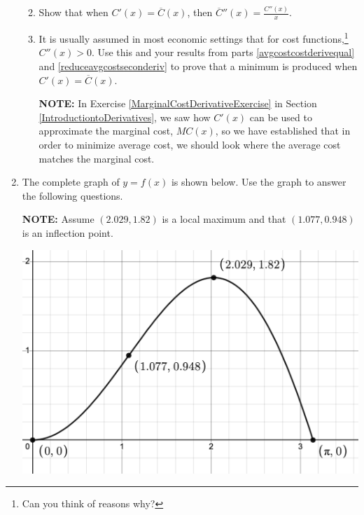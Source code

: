 \documentclass{ximera}
\begin{document}
\begin{enumerate}
\begin{enumerate}
\smallskip

\item\label{reduceavgcostseconderiv}  Show that when $C'(x) = \overline{C}(x)$, then $\overline{C}''(x)  = \frac{C''(x)}{x}$.

\smallskip

\item  It is usually assumed in most economic settings that for cost functions,\footnote{Can you think of reasons why?} $C''(x) > 0$.   Use this and your results from parts \ref{avgcostcostderivequal} and \ref{reduceavgcostseconderiv} to prove that a minimum is produced  when $C'(x) = \overline{C}(x)$.  

\smallskip

\textbf{NOTE:} In Exercise \ref{MarginalCostDerivativeExercise} in Section \ref{IntroductiontoDerivatives}, we saw how $C'(x)$ can be used to approximate the marginal cost, $MC(x)$, so we have established that in order to minimize average cost, we should look where the average cost matches the marginal cost.


\end{enumerate}

\item  The complete graph of $y = f(x)$ is shown below. Use the graph to answer the following questions.

\smallskip


\textbf{NOTE:} Assume $(2.029, 1.82)$ is a local maximum and that $(1.077, 0.948)$ is an inflection point.


\smallskip

\centerline{\includegraphics[width = 5in]{./AppDerivativesGraphics/T04Graph.PNG}}

\smallskip


\end{enumerate}
\end{document}

